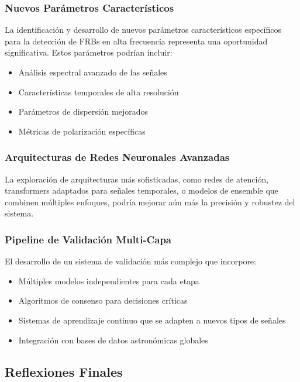 \subsubsection{Nuevos Parámetros Característicos}

La identificación y desarrollo de nuevos parámetros característicos específicos para la detección de FRBs en alta frecuencia representa una oportunidad significativa. Estos parámetros podrían incluir:

\begin{itemize}
    \item Análisis espectral avanzado de las señales
    \item Características temporales de alta resolución
    \item Parámetros de dispersión mejorados
    \item Métricas de polarización específicas
\end{itemize}

\subsubsection{Arquitecturas de Redes Neuronales Avanzadas}

La exploración de arquitecturas más sofisticadas, como redes de atención, transformers adaptados para señales temporales, o modelos de ensemble que combinen múltiples enfoques, podría mejorar aún más la precisión y robustez del sistema.

\subsubsection{Pipeline de Validación Multi-Capa}

El desarrollo de un sistema de validación más complejo que incorpore:

\begin{itemize}
    \item Múltiples modelos independientes para cada etapa
    \item Algoritmos de consenso para decisiones críticas
    \item Sistemas de aprendizaje continuo que se adapten a nuevos tipos de señales
    \item Integración con bases de datos astronómicas globales
\end{itemize}

\subsection{Reflexiones Finales}

